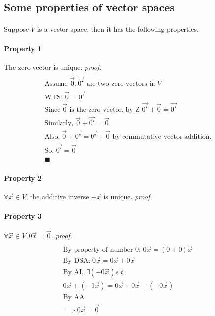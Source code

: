 \documentclass[11pt]{article}
\begin{document}
    \subsection{Some properties of vector spaces}
    \paragraph{} Suppose $V$ is a vector space, then it has the following properties.
    \paragraph{Property 1} The zero vector is unique.
    \newline
    \emph{proof.}
    \begin{multline*}
        \\
        \text{Assume }\vec{0}, \vec{0^\star} \text{ are two zero vectors in }V \\
        \text{WTS: }\vec{0} = \vec{0^\star} \\
        \text{Since $\vec{0}$ is the zero vector, by Z } \vec{0^\star} + \vec{0} = \vec{0^\star} \\
        \text{Similarly, }\vec{0} + \vec{0^\star} = \vec{0} \\
        \text{Also, } \vec{0} + \vec{0^\star} = \vec{0^\star} + \vec{0} \text{ by commutative vector addition.} \\
        \text{So, } \vec{0^\star} = \vec{0} \\
        \blacksquare
    \end{multline*}
    \paragraph{Property 2} $\forall \vec{x} \in V$, the additive inverse $-\vec{x}$ is unique.
    \newline
    \emph{proof.}
    
    
    \paragraph{Property 3} $\forall \vec{x} \in V, 0\vec{x} = \vec{0}$.
    \newline
    \emph{proof.}
    \begin{multline*}
        \\
        \text{By property of number 0: } 0 \vec{x} = (0 + 0) \vec{x}\\
        \text{By DSA: } 0\vec{x} = 0\vec{x} + 0 \vec{x} \\
        \text{By AI, } \exists (-0\vec{x}) s.t. \\
        0\vec{x} + (-0\vec{x}) = 0\vec{x} + 0 \vec{x} + (-0\vec{x}) \\
        \text{By AA} \\
        \implies 0 \vec{x} = \vec{0} \\
    \end{multline*}
    
\end{document}

